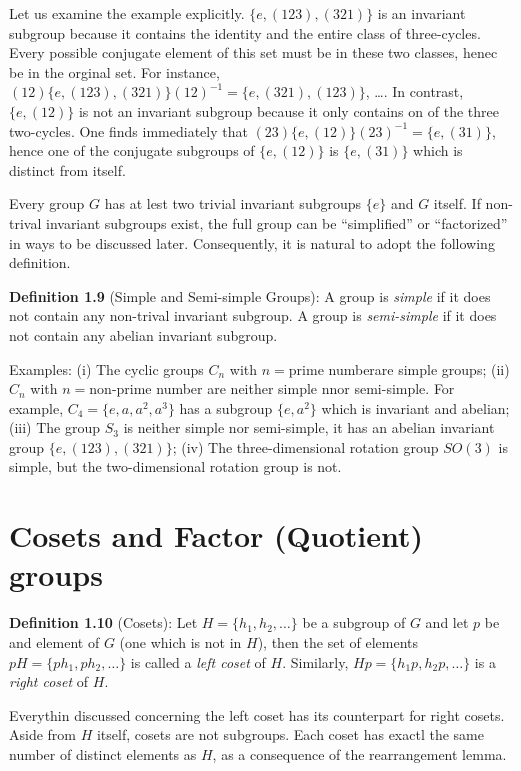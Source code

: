 Let us examine the example explicitly.
$\{ e, \left(123\right), \left(321\right)\}$ is an invariant subgroup because it contains the identity and the entire class of three-cycles.
Every possible conjugate element of this set must be in these two classes, henec be in the orginal set.
For instance, $\left(12\right)\{e, \left(123\right),\left(321\right)\}\left(12\right)^{-1}=\{e, \left(321\right),\left(123\right)\}$, \ldots.
In contrast, $\{e,\left(12\right)\}$ is not an invariant subgroup because it only contains on of the three two-cycles.
One finds immediately that $\left(23\right)\{e, \left(12\right)\}\left(23\right)^{-1} = \{e, \left(31\right)\}$, hence one of the conjugate subgroups of $\{e, \left(12\right)\}$ is $\{e, \left(31\right)\}$ which is distinct from itself.

Every group $G$ has at lest two trivial invariant subgroups $\{e\}$ and $G$ itself.
If non-trival invariant subgroups exist, the full group can be ``simplified'' or ``factorized'' in ways to be discussed later.
Consequently, it is natural to adopt the following definition.

\textbf{Definition 1.9} (Simple and Semi-simple Groups): A group is \textit{simple} if it does not contain any non-trival invariant subgroup.
A group is \textit{semi-simple} if it does not contain any abelian invariant subgroup.

\textrm{Examples}: (i) The cyclic groups $C_{n}$ with $n=$prime numberare simple groups; (ii) $C_{n}$ with $n=$non-prime number are neither simple nnor semi-simple.
For example, $C_{4}= \{e,a,a^{2},a^{3}\}$ has a subgroup $\{e, a^{2}\}$ which is invariant and abelian;
(iii) The group $S_{3}$ is neither simple nor semi-simple, it has an abelian invariant group $\{e, \left(123\right), \left(321\right)\}$;
(iv) The three-dimensional rotation group $SO\left(3\right)$ is simple, but the two-dimensional rotation group is not.

\section{Cosets and Factor (Quotient) groups}
\textbf{Definition 1.10} (Cosets): Let $H=\{h_{1},h_{2},\dots\}$ be a subgroup of $G$ and let $p$ be and element of $G$ (one which is not in $H$), then the set of elements $pH=\{ph_{1}, ph_{2},\dots\}$ is called a \textit{left coset} of $H$.
Similarly, $Hp= \{h_{1}p,h_{2}p,\dots\}$ is a \textit{right coset} of $H$.

Everythin discussed concerning the left coset has its counterpart for right cosets.
Aside from $H$ itself, cosets are not subgroups.
Each coset has exactl the same number of distinct elements as $H$, as a consequence of the rearrangement lemma.

